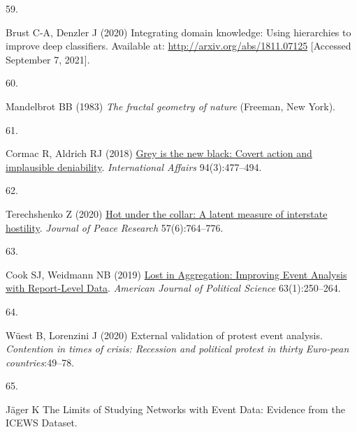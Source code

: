 \documentclass[9pt,twocolumn,twoside,lineno]{pnas-new}
\newlength{\cslhangindent}
\newlength{\csllabelwidth}
\newlength{\cslentryspacingunit} %
\newenvironment{CSLReferences}[2] %
 {%
  \setlength{\parindent}{0pt}
  \ifodd #1
  \let\oldpar\par
  \def\par{\hangindent=\cslhangindent\oldpar}
  \fi
  \setlength{\parskip}{#2\cslentryspacingunit}
 }%
 {}
\newcommand{\CSLLeftMargin}[1]{\parbox[t]{\csllabelwidth}{#1}}
\newcommand{\CSLRightInline}[1]{\parbox[t]{\linewidth - \csllabelwidth}{#1}\break}
\begin{document}
\begin{CSLReferences}{0}{0}
\leavevmode{}%
\CSLLeftMargin{59. }%
\CSLRightInline{Brust C-A, Denzler J (2020) Integrating domain
knowledge: Using hierarchies to improve deep classifiers. Available at:
\url{http://arxiv.org/abs/1811.07125} {[}Accessed September 7, 2021{]}.}

\leavevmode{}%
\CSLLeftMargin{60. }%
\CSLRightInline{Mandelbrot BB (1983) \emph{The fractal geometry of
nature} ({Freeman}, {New York}).}

\leavevmode{}%
\CSLLeftMargin{61. }%
\CSLRightInline{Cormac R, Aldrich RJ (2018)
\href{https://doi.org/10.1093/ia/iiy067}{Grey is the new black: Covert
action and implausible deniability}. \emph{International Affairs}
94(3):477--494.}

\leavevmode{}%
\CSLLeftMargin{62. }%
\CSLRightInline{Terechshenko Z (2020)
\href{https://doi.org/10.1177/0022343320962546}{Hot under the collar:
{A} latent measure of interstate hostility}. \emph{Journal of Peace
Research} 57(6):764--776.}

\leavevmode{}%
\CSLLeftMargin{63. }%
\CSLRightInline{Cook SJ, Weidmann NB (2019)
\href{https://doi.org/10.1111/ajps.12398}{Lost in {Aggregation}:
{Improving Event Analysis} with {Report-Level Data}}. \emph{American
Journal of Political Science} 63(1):250--264.}

\leavevmode{}%
\CSLLeftMargin{64. }%
\CSLRightInline{Wüest B, Lorenzini J (2020) External validation of
protest event analysis. \emph{Contention in times of crisis: Recession
and political protest in thirty Euro-pean countries}:49--78.}

\leavevmode{}%
\CSLLeftMargin{65. }%
\CSLRightInline{Jäger K The {Limits} of {Studying Networks} with {Event
Data}: {Evidence} from the {ICEWS Dataset}.}

\end{CSLReferences}




\end{document}
